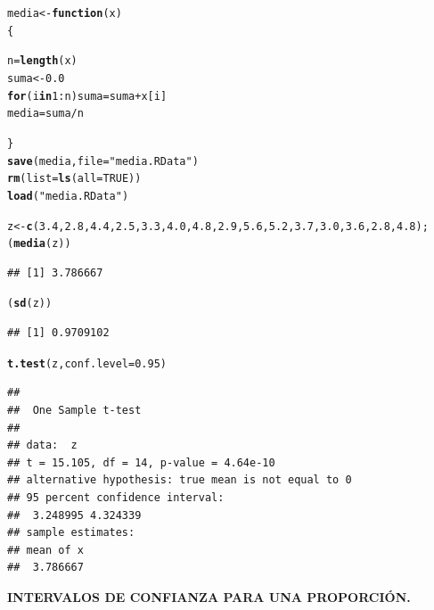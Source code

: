 \documentclass[12pt,letterpaper]{article}\usepackage[]{graphicx}\usepackage[]{color}
\makeatletter
\newcommand{\hlnum}[1]{\textcolor[rgb]{0.686,0.059,0.569}{#1}}%
\newcommand{\hlstr}[1]{\textcolor[rgb]{0.192,0.494,0.8}{#1}}%
\newcommand{\hlopt}[1]{\textcolor[rgb]{0,0,0}{#1}}%
\newcommand{\hlstd}[1]{\textcolor[rgb]{0.345,0.345,0.345}{#1}}%
\newcommand{\hlkwa}[1]{\textcolor[rgb]{0.161,0.373,0.58}{\textbf{#1}}}%
\newcommand{\hlkwb}[1]{\textcolor[rgb]{0.69,0.353,0.396}{#1}}%
\newcommand{\hlkwc}[1]{\textcolor[rgb]{0.333,0.667,0.333}{#1}}%
\newcommand{\hlkwd}[1]{\textcolor[rgb]{0.737,0.353,0.396}{\textbf{#1}}}%
\newenvironment{kframe}{%
 \def\at@end@of@kframe{}%
 \ifinner\ifhmode%
  \def\at@end@of@kframe{\end{minipage}}%
  \begin{minipage}{\columnwidth}%
 \fi\fi%
 \def\FrameCommand##1{\hskip\@totalleftmargin \hskip-\fboxsep
 \colorbox{shadecolor}{##1}\hskip-\fboxsep
     \hskip-\linewidth \hskip-\@totalleftmargin \hskip\columnwidth}%
 \MakeFramed {\advance\hsize-\width
   \@totalleftmargin\z@ \linewidth\hsize
   \@setminipage}}%
 {\par\unskip\endMakeFramed%
 \at@end@of@kframe}
\newenvironment{knitrout}{}{} %
\makeatother
\begin{document}
\begin{knitrout}
\color{fgcolor}\begin{kframe}
\begin{alltt}
\hlstd{media} \hlkwb{<-} \hlkwa{function}\hlstd{(}\hlkwc{x}\hlstd{)}
\hlstd{\{}

  \hlstd{n} \hlkwb{=} \hlkwd{length}\hlstd{(x)}
\hlstd{suma} \hlkwb{<-} \hlnum{0.0}
\hlkwa{for}\hlstd{(i} \hlkwa{in} \hlnum{1}\hlopt{:}\hlstd{n) suma} \hlkwb{=} \hlstd{suma} \hlopt{+} \hlstd{x[i]}
\hlstd{media} \hlkwb{=} \hlstd{suma}\hlopt{/}\hlstd{n}

\hlstd{\}}
\hlkwd{save}\hlstd{(media,} \hlkwc{file}\hlstd{=} \hlstr{"media.RData"}\hlstd{)}
\hlkwd{rm}\hlstd{(}\hlkwc{list}\hlstd{=}\hlkwd{ls}\hlstd{(}\hlkwc{all}\hlstd{=}\hlnum{TRUE}\hlstd{))}
\hlkwd{load}\hlstd{(}\hlstr{"media.RData"}\hlstd{)}

\hlstd{z} \hlkwb{<-}\hlkwd{c}\hlstd{(}\hlnum{3.4}\hlstd{,} \hlnum{2.8}\hlstd{,} \hlnum{4.4}\hlstd{,} \hlnum{2.5}\hlstd{,} \hlnum{3.3}\hlstd{,}\hlnum{4.0}\hlstd{,} \hlnum{4.8}\hlstd{,} \hlnum{2.9}\hlstd{,} \hlnum{5.6}\hlstd{,} \hlnum{5.2}\hlstd{,} \hlnum{3.7}\hlstd{,} \hlnum{3.0}\hlstd{,} \hlnum{3.6}\hlstd{,} \hlnum{2.8}\hlstd{,} \hlnum{4.8}\hlstd{);}
\hlstd{(}\hlkwd{media}\hlstd{(z))}
\end{alltt}
\begin{verbatim}
## [1] 3.786667
\end{verbatim}
\begin{alltt}
\hlstd{(}\hlkwd{sd}\hlstd{(z))}
\end{alltt}
\begin{verbatim}
## [1] 0.9709102
\end{verbatim}
\begin{alltt}
\hlkwd{t.test}\hlstd{(z,} \hlkwc{conf.level} \hlstd{=} \hlnum{0.95}\hlstd{)}
\end{alltt}
\begin{verbatim}
## 
## 	One Sample t-test
## 
## data:  z
## t = 15.105, df = 14, p-value = 4.64e-10
## alternative hypothesis: true mean is not equal to 0
## 95 percent confidence interval:
##  3.248995 4.324339
## sample estimates:
## mean of x 
##  3.786667
\end{verbatim}
\end{kframe}
\end{knitrout}

\begin{center}
\textbf{INTERVALOS DE CONFIANZA PARA UNA PROPORCI\'ON.}
\end{center}
\end{document}
